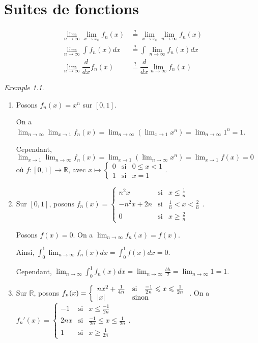 \documentclass{report}
\newcommand*{\dlim}[3]{\displaystyle\lim_{#1 \to #2}#3}
\newcommand*{\dint}[3]{\displaystyle\int_{#1}^{#2}#3}
\newcommand*{\abs}[1]{\left| #1 \right|}
\newcommand*{\lte}{\leqslant}
\newcommand*{\gte}{\geqslant}
\newcommand*{\reels}{\mathbb{R}}
\theoremstyle{definition}
\theoremstyle{remark}
\newtheorem*{exem}{Exemple}
\begin{document}
	\chapter{Suites de fonctions}
	\begin{align*}
		\dlim{n}{\infty}{\dlim{x}{x_0}{f_n(x)}} &\overset{?}{=} \dlim{x}{x_0}{\dlim{n}{\infty}{f_n(x)}}\\
		\dlim{n}{\infty}{\dint{}{}{f_n(x)dx}} &\overset{?}{=} \dint{}{}{\dlim{n}{\infty}{f_n(x)}dx}\\
		\dlim{n}{\infty}{\dfrac{d}{dx}f_n(x)} &\overset{?}{=} \dfrac{d}{dx}\dlim{n}{\infty}{f_n(x)}
	\end{align*}
	\begin{exem}
		~

		\begin{enumerate}
			\item Posons $f_n(x) = x^n$ sur $[0,1]$.

			On a $\dlim{n}{\infty}{\dlim{x}{1}{f_n(x)}} = \dlim{n}{\infty}{\left( \dlim{x}{1}{x^n} \right)} = \dlim{n}{\infty}{1^n} = 1$.

			Cependant, $\dlim{x}{1}{\dlim{n}{\infty}{f_n(x)}} = \dlim{x}{1}{\left( \dlim{n}{\infty}{x^n} \right)} = \dlim{x}{1}{f(x)} = 0$ o\`u $f:[0,1] \to \reels$, avec $x \mapsto \left\lbrace \begin{array}{lll}
				0&\text{si}&0 \lte x<1\\
				1&\text{si}&x=1
			\end{array} \right.$.
			\item Sur $[0,1]$, posons $f_n(x) = \left\lbrace \begin{array}{lll}
				n^2x&\text{si}&x \lte \frac{1}{n}\\
				-n^2x+2n&\text{si}&\frac{1}{n}<x<\frac{2}{n}\\
				0&\text{si}&x \gte \frac{2}{n}
			\end{array} \right.$.

			Posons $f(x)= 0$. On a $\dlim{n}{\infty}{f_n(x)} = f(x)$.

			Ainsi, $\dint{0}{1}{\dlim{n}{\infty}{f_n(x)}dx} = \dint{0}{1}{f(x)dx} = 0$.

			Cependant, $\dlim{n}{\infty}{\dint{0}{1}{f_n(x)dx}} = \dlim{n}{\infty}{\frac{bh}{2}} = \dlim{n}{\infty}{1} = 1$.
			\item Sur $\reels$, posons $f_n(x) = \left\lbrace \begin{array}{lll}
				nx^2+\frac{1}{4n}&\text{si}&\frac{-1}{2n} \lte x \lte \frac{1}{2n}\\
				\abs{x}&\multicolumn{2}{l}{\text{sinon}}
			\end{array} \right.$. On a $f_n'(x) = \left\{ \begin{array}{lll}
				-1&\text{si}&x \lte \frac{-1}{2n}\\
				2nx&\text{si}&\frac{-1}{2n} \lte x \lte \frac{1}{2n}\\
				1&\text{si}&x \gte \frac{1}{2n}
			\end{array} \right.$.


\end{enumerate}
\end{exem}
\end{document}
